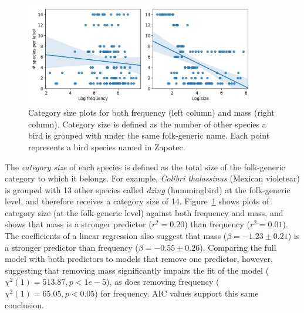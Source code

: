 \documentclass[10pt,letterpaper]{article}
\begin{document}
\begin{figure}[!ht]
  \begin{center}
    \includegraphics[width=0.90\textwidth]{./figures/ssrr-singlespecies.png}
    \vspace{-0.1in}
        \caption{Category size plots for both frequency (left column) and mass (right column). Category size is defined as the number of other species a bird is grouped with under the same folk-generic name. Each point represents a bird species named in Zapotec.}
        \label{fig-ssrr}
  \end{center}
\end{figure}

The \emph{category size} of each species is defined as the total size of the folk-generic category to which it belongs. For example, \emph{ Colibri thalassinus} (Mexican violetear) is grouped with 13 other species called \textit{dz\v{\i}n\b{g}} (hummingbird) at the folk-generic level, and therefore receives a category size of 14.  Figure~\ref{fig-ssrr} shows plots of category size (at the folk-generic level) against both frequency and mass, and shows that mass is a stronger predictor ($r^2 = 0.20$) than frequency ($r^2 = 0.01$). 
The coefficients of a linear regression also suggest that mass ($\beta = -1.23 \pm 0.21$) is a stronger predictor than frequency ($\beta = -0.55 \pm 0.26$). Comparing the full model with both predictors to models that remove one predictor, however, suggesting that removing mass significantly impairs the fit of the model ($\chi^{2}(1) = 513.87, p < 1e-5$), as does removing frequency ($\chi^{2}(1) = 65.05, p < 0.05$) for frequency. AIC values support this same conclusion.
\end{document}
